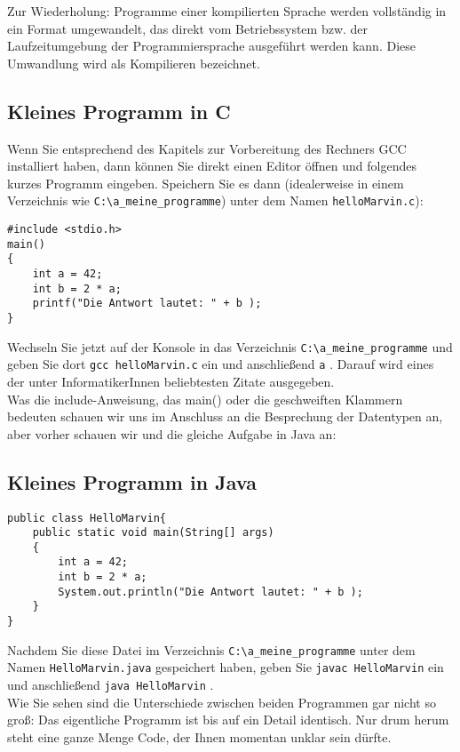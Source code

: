 Zur Wiederholung: Programme einer kompilierten Sprache werden vollständig in ein Format umgewandelt, das direkt vom Betriebssystem bzw. der Laufzeitumgebung der Programmiersprache ausgeführt werden kann. Diese Umwandlung wird als Kompilieren bezeichnet.

\subsection{Kleines Programm in C}

Wenn Sie entsprechend des Kapitels zur Vorbereitung des Rechners GCC installiert haben, dann können Sie direkt einen Editor öffnen und folgendes kurzes Programm eingeben. Speichern Sie es dann (idealerweise in einem Verzeichnis wie \verb|C:\a_meine_programme|) unter dem Namen \verb|helloMarvin.c|):\\

\begin{verbatim}
#include <stdio.h>
main()
{
	int a = 42;
	int b = 2 * a;
	printf("Die Antwort lautet: " + b );
}
\end{verbatim}

Wechseln Sie jetzt auf der Konsole in das Verzeichnis \verb|C:\a_meine_programme| und geben Sie dort \verb|gcc helloMarvin.c| ein und anschließend \verb|a| . Darauf wird eines der unter InformatikerInnen beliebtesten Zitate ausgegeben.\\

Was die include-Anweisung, das main() oder die geschweiften Klammern bedeuten schauen wir uns im Anschluss an die Besprechung der Datentypen an, aber vorher schauen wir und die gleiche Aufgabe in Java an:

\subsection{Kleines Programm in Java}

\begin{verbatim}
public class HelloMarvin{
	public static void main(String[] args)
	{
		int a = 42;
		int b = 2 * a;
		System.out.println("Die Antwort lautet: " + b );
	}
}
\end{verbatim}

Nachdem Sie diese Datei im Verzeichnis \verb|C:\a_meine_programme| unter dem Namen \verb|HelloMarvin.java| gespeichert haben, geben Sie \verb|javac HelloMarvin| ein und anschließend \verb|java HelloMarvin| .\\

Wie Sie sehen sind die Unterschiede zwischen beiden Programmen gar nicht so groß: Das eigentliche Programm ist bis auf ein Detail identisch. Nur drum herum steht eine ganze Menge Code, der Ihnen momentan unklar sein dürfte.\\

